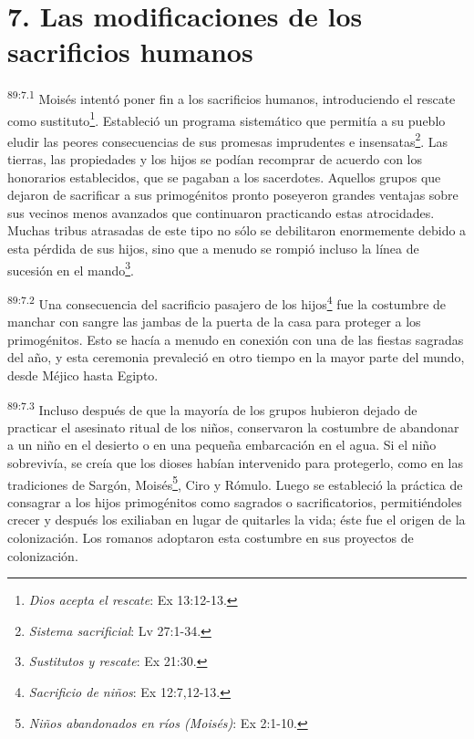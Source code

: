 \documentclass[twoside, 11pt]{book}
\begin{document}
\section*{7. Las modificaciones de los sacrificios humanos}
\par
\textsuperscript{89:7.1} Moisés intentó poner fin a los sacrificios humanos, introduciendo el rescate como sustituto\footnote{\textit{Dios acepta el rescate}: Ex 13:12-13.}. Estableció un programa sistemático que permitía a su pueblo eludir las peores consecuencias de sus promesas imprudentes e insensatas\footnote{\textit{Sistema sacrificial}: Lv 27:1-34.}. Las tierras, las propiedades y los hijos se podían recomprar de acuerdo con los honorarios establecidos, que se pagaban a los sacerdotes. Aquellos grupos que dejaron de sacrificar a sus primogénitos pronto poseyeron grandes ventajas sobre sus vecinos menos avanzados que continuaron practicando estas atrocidades. Muchas tribus atrasadas de este tipo no sólo se debilitaron enormemente debido a esta pérdida de sus hijos, sino que a menudo se rompió incluso la línea de sucesión en el mando\footnote{\textit{Sustitutos y rescate}: Ex 21:30.}.

\par
\textsuperscript{89:7.2} Una consecuencia del sacrificio pasajero de los hijos\footnote{\textit{Sacrificio de niños}: Ex 12:7,12-13.} fue la costumbre de manchar con sangre las jambas de la puerta de la casa para proteger a los primogénitos. Esto se hacía a menudo en conexión con una de las fiestas sagradas del año, y esta ceremonia prevaleció en otro tiempo en la mayor parte del mundo, desde Méjico hasta Egipto.

\par
\textsuperscript{89:7.3} Incluso después de que la mayoría de los grupos hubieron dejado de practicar el asesinato ritual de los niños, conservaron la costumbre de abandonar a un niño en el desierto o en una pequeña embarcación en el agua. Si el niño sobrevivía, se creía que los dioses habían intervenido para protegerlo, como en las tradiciones de Sargón, Moisés\footnote{\textit{Niños abandonados en ríos (Moisés)}: Ex 2:1-10.}, Ciro y Rómulo. Luego se estableció la práctica de consagrar a los hijos primogénitos como sagrados o sacrificatorios, permitiéndoles crecer y después los exiliaban en lugar de quitarles la vida; éste fue el origen de la colonización. Los romanos adoptaron esta costumbre en sus proyectos de colonización.
\end{document}
